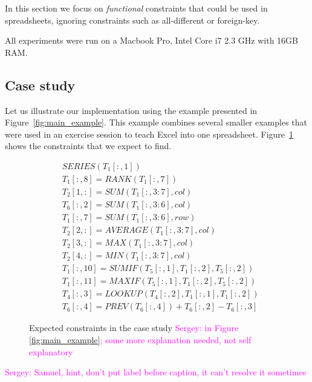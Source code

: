 \documentclass{ecai}
\newcommand{\sergey}[1]{\textcolor{magenta}{{\sc Sergey:} #1}\xspace}
\newcommand{\range}[3]{\ensuremath{#1[#2,#3]}}
\newcommand{\rangeto}[2]{#1{:}#2}
\newcommand{\rangeall}{:}
\newcommand{\eccalc}[2]{\ensuremath{#1 = #2}}
\newcommand{\ecrank}[2]{\eccalc{#1}{\mathit{RANK}(#2)}}
\newcommand{\eclookupf}[4]{\ensuremath{\mathit{LOOKUP}_{#4}(#1, #2, #3)}}
\newcommand{\eclookup}[4]{\eccalc{#1}{\eclookupf{#2}{#3}{#4}{}}}
\newcommand{\ecaggc}[3]{\eccalc{#2}{\mathit{#1}(#3, col)}}
\newcommand{\ecsumc}[2]{\eccalc{#1}{\mathit{SUM}(#2, col)}}
\newcommand{\ecsumr}[2]{\eccalc{#1}{\mathit{SUM}(#2, row)}}
\newcommand{\ecaggif}[5]{\eccalc{#2}{\mathit{#1IF}(#3, #4, #5)}}
\begin{document}
In this section we focus on \textit{functional} constraints that could be used in spreadsheets, ignoring constraints such as all-different or foreign-key.

All experiments were run on a Macbook Pro, Intel Core i7 2.3 GHz with 16GB RAM.

\subsection{Case study}
Let us illustrate our implementation using the example presented in Figure~\ref{fig:main_example}.
This example combines several smaller examples that were used in an exercise session to teach Excel into one spreadsheet.
Figure~\ref{fig:sol_example} shows the constraints that we expect to find.

\begin{figure}
  {\small
    \begin{align*}
      & SERIES(\range{T_{1}}{\rangeall}{1}) \\
%
      & \ecrank{\range{T_{1}}{\rangeall}{8}}{\range{T_{1}}{\rangeall}{7}} \\
%
      & \ecsumc{\range{T_{2}}{1}{\rangeall}}{\range{T_{1}}{\rangeall}{\rangeto{3}{7}}} \\
%
      & \ecsumc{\range{T_{6}}{\rangeall}{2}}{\range{T_{1}}{\rangeall}{\rangeto{3}{6}}} \\
%
      & \ecsumr{\range{T_{1}}{\rangeall}{7}}{\range{T_{1}}{\rangeall}{\rangeto{3}{6}}} \\
%
      & \ecaggc{AVERAGE}{\range{T_{2}}{2}{\rangeall}}{\range{T_{1}}{\rangeall}{\rangeto{3}{7}}} \\
%
      & \ecaggc{MAX}{\range{T_{2}}{3}{\rangeall}}{\range{T_{1}}{\rangeall}{\rangeto{3}{7}}} \\
%
      & \ecaggc{MIN}{\range{T_{2}}{4}{\rangeall}}{\range{T_{1}}{\rangeall}{\rangeto{3}{7}}} \\
%
      & \ecaggif{SUM}{\range{T_{1}}{\rangeall}{10}}{\range{T_{5}}{\rangeall}{1}}{\range{T_{1}}{\rangeall}{2}}{\range{T_{5}}{\rangeall}{2}} \\
%
      & \ecaggif{MAX}{\range{T_{1}}{\rangeall}{11}}{\range{T_{5}}{\rangeall}{1}}{\range{T_{1}}{\rangeall}{2}}{\range{T_{5}}{\rangeall}{2}} \\
%
      & \eclookup{\range{T_{4}}{\rangeall}{3}}{\range{T_{4}}{\rangeall}{2}}{\range{T_{1}}{\rangeall}{1}}{\range{T_{1}}{\rangeall}{2}} \\
%
      & \range{T_{6}}{\rangeall}{4} = PREV(\range{T_{6}}{\rangeall}{4}) + \range{T_{6}}{\rangeall}{2} - \range{T_{6}}{\rangeall}{3}
    \end{align*}
  }
  \caption{Expected constraints in the case study \sergey{in Figure \ref{fig:main_example}; some more explanation needed, not self explanatory}}
  \label{fig:sol_example}
\end{figure}
\sergey{Samuel, hint, don't put label before caption, it can't resolve it sometimes}
\end{document}
